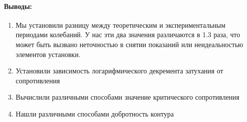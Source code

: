 \documentclass[a4paper,12pt]{article}
\begin{document}
\paragraph{Выводы:}
\begin{enumerate}
\item Мы установили разницу между теоретическим и экспериментальным периодами колебаний. У нас эти два значения различаются в 1.3 раза, что может быть вызвано неточностью в снятии показаний или неидеальностью элементов установки.
\item Установили зависимость логарифмического декремента затухания от сопротивления 
\item Вычислили различными способами значение критического сопротивления
\item Нашли различными способами добротность контура  
\end{enumerate} 
\end{document}
